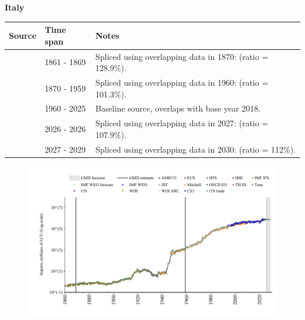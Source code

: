 \documentclass[12pt,a4paper,landscape]{article}
\begin{document}
\begin{adjustbox}{max totalsize={\paperwidth}{\paperheight},center}
\begin{minipage}[t][\textheight][t]{\textwidth}
\vspace*{0.5cm}
{}
\begin{center}
{\Large\bfseries Italy}
\end{center}
\vspace{0.5cm}
\begin{table}[H]
\centering
\small
\begin{tabular}{|l|l|l|}
\hline
\textbf{Source} & \textbf{Time span} & \textbf{Notes} \\
\hline
\rowcolor{white}\cite{Tena}& 1861 - 1869 &Spliced using overlapping data in 1870: (ratio = 128.9\%).\\
\rowcolor{lightgray}\cite{JST}& 1870 - 1959 &Spliced using overlapping data in 1960: (ratio = 101.3\%).\\
\rowcolor{white}\cite{OECD_EO}& 1960 - 2025 &Baseline source, overlaps with base year 2018.\\
\rowcolor{lightgray}\cite{AMECO}& 2026 - 2026 &Spliced using overlapping data in 2027: (ratio = 107.9\%).\\
\rowcolor{white}\cite{IMF_WEO_forecast}& 2027 - 2029 &Spliced using overlapping data in 2030: (ratio = 112\%).\\
\hline
\end{tabular}
\end{table}
\begin{figure}[H]
\centering
\includegraphics[width=\textwidth,height=0.6\textheight,keepaspectratio]{graphs/ITA_imports.pdf}
\end{figure}
\end{minipage}
\end{adjustbox}
\end{document}
